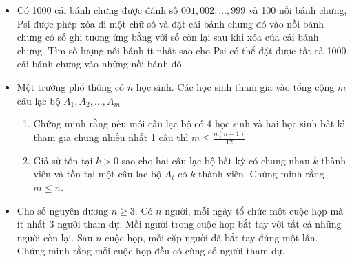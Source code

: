\documentclass[11pt]{scrartcl}
\begin{document}
\begin{itemize}[label=, leftmargin=0em, itemsep=-0em]

    \item \begin{btvn} Có 1000 cái bánh chưng được đánh số $001,002,\dots,999$ và 100 nồi bánh chưng, Psi được phép xóa đi một chữ số và đặt cái bánh chưng đó vào nồi bánh chưng có số ghi tương ứng bằng với số còn lại sau khi xóa của cái bánh chưng. Tìm số lượng nồi bánh ít nhất sao cho Psi có thể đặt được tất cả 1000 cái bánh chưng vào những nồi bánh đó.        
    \end{btvn}
    \item \begin{btvn}
        Một trường phổ thông có $n$ học sinh. Các học sinh tham gia vào tổng cộng $m$ câu lạc bộ $A_1,A_2,\dots,A_m$
        \begin{enumerate}[label=(\alph*)]
            \item Chứng minh rằng nếu mỗi câu lạc bộ có 4 học sinh và hai học sinh bất kì tham gia chung nhiều nhất 1 câu thì $m \leq \frac{n(n - 1)}{12}$
            \item Giả sử tồn tại $k > 0$ sao cho hai câu lạc bộ bất kỳ có chung nhau $k$ thành viên và tồn tại một câu lạc bộ $A_t$ có $k$ thành viên. Chứng minh rằng $m \leq n$.
        \end{enumerate}
    \end{btvn}
    \item \begin{btvn}
        Cho số nguyên dương $n \geq 3$. Có $n$ người, mỗi ngày tổ chức một cuộc họp mà ít nhất 3 người tham dự. Mỗi người trong cuộc họp bắt tay với tất cả những người còn lại. Sau $n$ cuộc họp, mỗi cặp người đã bắt tay đúng một lần. Chứng minh rằng mỗi cuộc họp đều có cùng số người tham dự.
    \end{btvn}


\end{itemize}
\end{document}
